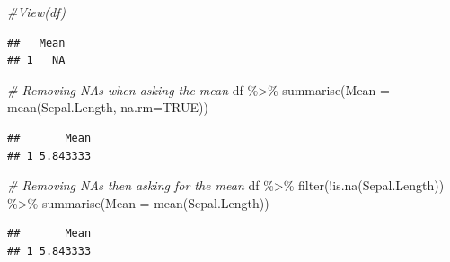 \documentclass[
]{book}
\newenvironment{Shaded}{\begin{snugshade}}{\end{snugshade}}
\newcommand{\AttributeTok}[1]{\textcolor[rgb]{0.77,0.63,0.00}{#1}}
\newcommand{\CommentTok}[1]{\textcolor[rgb]{0.56,0.35,0.01}{\textit{#1}}}
\newcommand{\ConstantTok}[1]{\textcolor[rgb]{0.00,0.00,0.00}{#1}}
\newcommand{\FunctionTok}[1]{\textcolor[rgb]{0.00,0.00,0.00}{#1}}
\newcommand{\NormalTok}[1]{#1}
\newcommand{\OtherTok}[1]{\textcolor[rgb]{0.56,0.35,0.01}{#1}}
\newcommand{\SpecialCharTok}[1]{\textcolor[rgb]{0.00,0.00,0.00}{#1}}
\begin{document}
\begin{Shaded}
\begin{Highlighting}[]
\CommentTok{\#View(df)}
\end{Highlighting}
\end{Shaded}

\begin{Shaded}
\end{Shaded}

\begin{verbatim}
##   Mean
## 1   NA
\end{verbatim}

\begin{Shaded}
\begin{Highlighting}[]
\CommentTok{\# Removing NAs when asking the mean}
\NormalTok{df }\SpecialCharTok{\%\textgreater{}\%} 
  \FunctionTok{summarise}\NormalTok{(}\AttributeTok{Mean =} \FunctionTok{mean}\NormalTok{(Sepal.Length, }\AttributeTok{na.rm=}\ConstantTok{TRUE}\NormalTok{))}
\end{Highlighting}
\end{Shaded}

\begin{verbatim}
##       Mean
## 1 5.843333
\end{verbatim}

\begin{Shaded}
\begin{Highlighting}[]
\CommentTok{\# Removing NAs then asking for the mean}
\NormalTok{df }\SpecialCharTok{\%\textgreater{}\%} 
  \FunctionTok{filter}\NormalTok{(}\SpecialCharTok{!}\FunctionTok{is.na}\NormalTok{(Sepal.Length)) }\SpecialCharTok{\%\textgreater{}\%} 
  \FunctionTok{summarise}\NormalTok{(}\AttributeTok{Mean =} \FunctionTok{mean}\NormalTok{(Sepal.Length))}
\end{Highlighting}
\end{Shaded}

\begin{verbatim}
##       Mean
## 1 5.843333
\end{verbatim}
\end{document}
